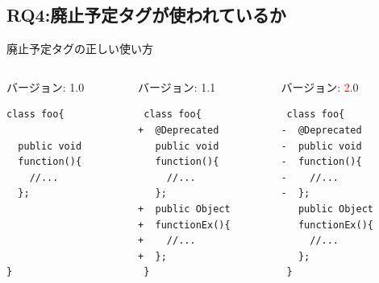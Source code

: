 \subsection{RQ4:廃止予定タグが使われているか}
\begin{frame}[fragile]{廃止予定タグの正しい使い方}
\begin{columns}
\begin{column}{0.33\textwidth}
バージョン: 1.0
\begin{lstlisting}
class foo{

  public void 
  function(){
    //...
  };




}
\end{lstlisting}
\end{column}
\begin{column}{0.33\textwidth}
バージョン: 1.\textcolor{green!80!black}{1}
\begin{lstlisting}
 class foo{
+  @Deprecated
   public void 
   function(){
     //...
   };
+  public Object
+  functionEx(){
+    //...
+  };
 }
\end{lstlisting}
\end{column}
\begin{column}{0.33\textwidth}
バージョン: \textcolor{red}{2}.0
\begin{lstlisting}
 class foo{
-  @Deprecated
-  public void 
-  function(){
-    //...
-  };
   public Object 
   functionEx(){
     //...
   };
 }
\end{lstlisting}
\end{column}
\end{columns}
\end{frame}


